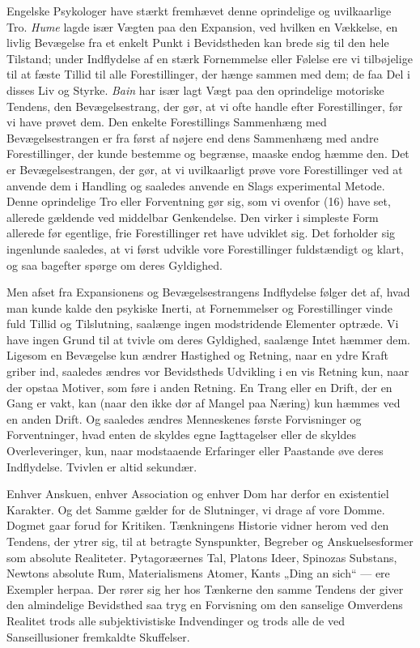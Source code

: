 \documentclass[12pt,a4paper]{book}
\newcommand{\apage}[1]{\marginnote{\footnotesize\textit{[#1]}}}
\begin{document}
Engelske Psykologer have stærkt fremhævet denne oprindelige og
uvilkaarlige Tro. \emph{Hume} lagde især Vægten paa \apage{100} den Expansion, ved
hvilken en Vækkelse, en livlig Bevægelse fra et enkelt Punkt i
Bevidstheden kan brede sig til den hele Tilstand; under Indflydelse af
en stærk Fornemmelse eller Følelse ere vi tilbøjelige til at fæste Tillid
til alle Forestillinger, der hænge sammen med dem; de faa Del i disses
Liv og Styrke. \emph{Bain} har især lagt Vægt paa den oprindelige
motoriske Tendens, den Bevægelsestrang, der gør, at vi ofte handle efter
Forestillinger, før vi have prøvet dem. Den enkelte Forestillings
Sammenhæng med Bevægelsestrangen er fra først af nøjere end dens
Sammenhæng med andre Forestillinger, der kunde bestemme og begrænse,
maaske endog hæmme den. Det er Bevægelsestrangen, der gør, at vi
uvilkaarligt prøve vore Forestillinger ved at anvende dem i Handling og
saaledes anvende en Slags experimental Metode.
Denne oprindelige Tro eller Forventning gør sig, som vi ovenfor (16)
have set, allerede gældende ved middelbar Genkendelse. Den virker i
simpleste Form allerede før egentlige, frie Forestillinger ret have
udviklet sig. Det forholder sig ingenlunde saaledes, at vi først udvikle
vore Forestillinger fuldstændigt og klart, og saa bagefter spørge om
deres Gyldighed.

Men afset fra Expansionens og Bevægelsestrangens Indflydelse følger det
af, hvad man kunde kalde den psykiske Inerti, at Fornemmelser og
Forestillinger vinde fuld Tillid og Tilslutning, saalænge ingen
modstridende Elementer optræde. Vi have ingen Grund til at tvivle om
deres Gyldighed, saalænge Intet hæmmer dem. Ligesom en Bevægelse kun
ændrer Hastighed og Retning, naar en ydre Kraft griber ind, saaledes
ændres vor Bevidstheds Udvikling i en vis Retning kun, naar der opstaa
Motiver, som føre i anden Retning. En Trang eller en Drift, der en Gang
er vakt, kan (naar den ikke dør af Mangel paa Næring) kun hæmmes ved en
anden Drift. Og saaledes ændres Menneskenes første Forvisninger og
Forventninger, hvad enten de skyldes egne Iagttagelser eller de skyldes
Overleveringer, kun, naar modstaaende Erfaringer eller Paastande øve
deres Indflydelse. Tvivlen er altid sekundær.

\apage{101} Enhver Anskuen, enhver Association og enhver Dom har derfor en
existentiel Karakter. Og det Samme gælder for de Slutninger, vi drage af
vore Domme. Dogmet gaar forud for Kritiken. Tænkningens Historie vidner
herom ved den Tendens, der ytrer sig, til at betragte Synspunkter,
Begreber og Anskuelsesformer som absolute Realiteter. Pytagoræernes Tal,
Platons Ideer, Spinozas Substans, Newtons absolute Rum, Materialismens
Atomer, Kants „Ding an sich“ --- ere Exempler herpaa. Der rører sig her
hos Tænkerne den samme Tendens der giver den almindelige Bevidsthed saa
tryg en Forvisning om den sanselige Omverdens Realitet trods alle
subjektivistiske Indvendinger og trods alle de ved Sanseillusioner
fremkaldte Skuffelser.
\end{document}
